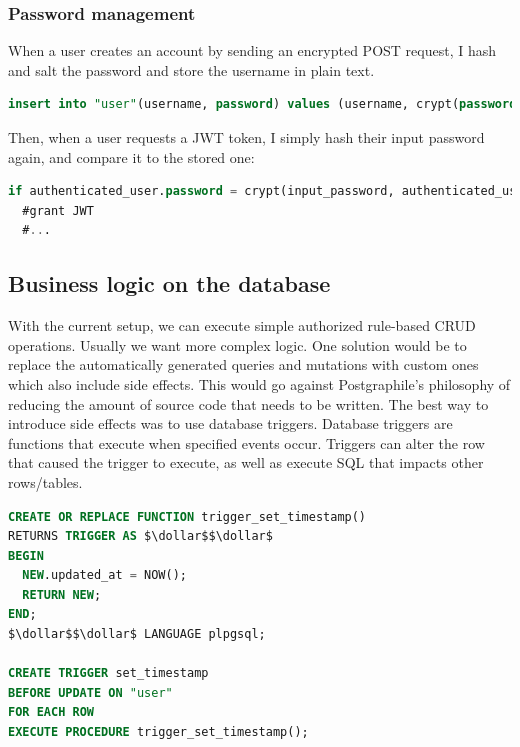 \documentclass{l4proj}
\begin{document}
\subsubsection{Password management}
When a user creates an account by sending an encrypted POST request, I hash and salt the password and store the username in plain text.

\begin{lstlisting}[language=SQL, caption={Hashing and salting done with pgcrypto}]
insert into "user"(username, password) values (username, crypt(password, gen_salt('bf')));
\end{lstlisting}

Then, when a user requests a JWT token, I simply hash their input password again, and compare it to the stored one:
\begin{lstlisting}[language=SQL, caption={Hashing and salting done with pgcrypto}]
if authenticated_user.password = crypt(input_password, authenticated_user.password) then
  #grant JWT
  #...
\end{lstlisting}

\subsection{Business logic on the database}
With the current setup, we can execute simple authorized rule-based CRUD operations. Usually we want more complex logic. One solution would be to replace the automatically generated queries and mutations with custom ones which also include side effects. This would go against Postgraphile's philosophy of reducing the amount of source code that needs to be written. The best way to introduce side effects was to use database triggers. Database triggers are functions that execute when specified events occur. Triggers can alter the row that caused the trigger to execute, as well as execute SQL that impacts other rows/tables.

\begin{lstlisting}[language=SQL, caption={Definition of a function which sets the row's ``updated\_at'' column to be the current time, along with a trigger which binds it to user updates.}]
CREATE OR REPLACE FUNCTION trigger_set_timestamp()
RETURNS TRIGGER AS $\dollar$$\dollar$ 
BEGIN
  NEW.updated_at = NOW();
  RETURN NEW;
END;
$\dollar$$\dollar$ LANGUAGE plpgsql;

CREATE TRIGGER set_timestamp
BEFORE UPDATE ON "user"
FOR EACH ROW
EXECUTE PROCEDURE trigger_set_timestamp();
\end{lstlisting}
\end{document}
